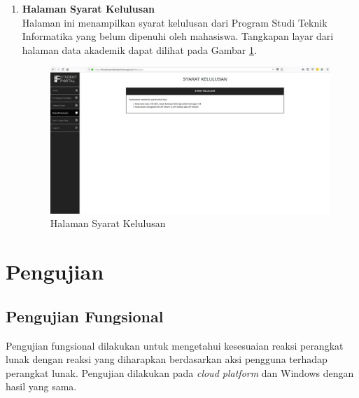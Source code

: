 \begin{enumerate}
				\item\textbf{Halaman Syarat Kelulusan}\\
				Halaman ini menampilkan syarat kelulusan dari Program Studi Teknik Informatika yang belum dipenuhi oleh mahasiswa. Tangkapan layar dari halaman data akademik dapat dilihat pada Gambar \ref{fig:5_halaman_syarat_kelulusan}.
				\begin{figure}[H]
						\centering
						\includegraphics[scale=0.34]{Gambar/halaman_syarat_kelulusan}
						\caption{Halaman Syarat Kelulusan} 
						\label{fig:5_halaman_syarat_kelulusan}
					\end{figure}
		\end{enumerate}
		
\section{Pengujian}

\subsection{Pengujian Fungsional}
\label{subsec:fungsional}

Pengujian fungsional dilakukan untuk mengetahui kesesuaian reaksi perangkat lunak dengan reaksi yang diharapkan berdasarkan aksi pengguna terhadap perangkat lunak. Pengujian dilakukan pada \textit{cloud platform} dan Windows dengan hasil yang sama.

